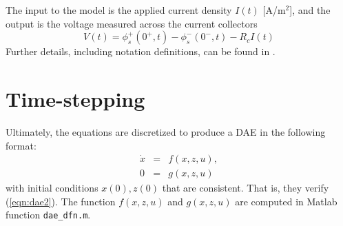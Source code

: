 \documentclass[12pt]{article}
\newcommand{\xdot}{\dot{x}}
\begin{document}
The input to the model is the applied current density  $I(t)$ [A/m$^{2}$], and the output is the voltage measured across the current collectors
\begin{equation}\label{eqn:voltage}
	V(t) = \phi^{+}_{s}(0^{+},t) - \phi_{s}^{-}(0^{-},t) - R_c I(t)
\end{equation}
Further details, including notation definitions, can be found in \cite{Thomas2002,Chaturvedi2010}.

\section{Time-stepping}\label{sec:time-step}

Ultimately, the equations are discretized to produce a DAE in the following format:
\begin{eqnarray}
	\xdot &=& f(x, z, u), \label{eqn:dae1} \\
	0 &=& g(x,z,u) \label{eqn:dae2}
\end{eqnarray}
with initial conditions $x(0), z(0)$ that are consistent. That is, they verify (\ref{eqn:dae2}). The function $f(x,z,u)$ and $g(x,z,u)$ are computed in Matlab function \texttt{dae\_dfn.m}. 
\end{document}
